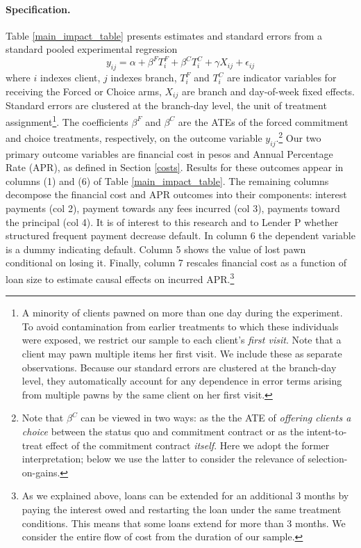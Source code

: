 \documentclass[oneside,11pt]{article}
\begin{document}
\paragraph{Specification.} Table \ref{main_impact_table} presents estimates and standard errors from a standard pooled experimental regression 
\begin{equation} \label{basic_reg}
    y_{ij} = \alpha + \beta^F T_{i}^F + \beta^C T_{i}^C + \gamma X_{ij} + \epsilon_{ij}
\end{equation}
where $i$ indexes client, $j$ indexes branch, $T_{i}^F$ and $T_{i}^C$ are indicator variables for receiving the Forced or Choice arms, $X_{ij}$ are branch and day-of-week fixed effects. Standard errors are clustered at the branch-day level, the unit of treatment assignment\footnote{A minority of clients pawned on more than one day during the experiment. To avoid contamination from earlier treatments to which these individuals were exposed, we restrict our sample to each client's \emph{first visit}. Note that a client may pawn multiple items her first visit. We include these as separate observations. Because our standard errors are clustered at the branch-day level, they automatically account for any dependence in error terms arising from multiple pawns by the same client on her first visit.}.
The coefficients $\beta^F$ and $\beta^C$ are the ATEs of the forced commitment and choice treatments, respectively, on the outcome variable $y_{ij}$.\footnote{Note that $\beta^C$ can be viewed in two ways: as the the ATE of \emph{offering clients a choice} between the status quo and commitment contract or as the intent-to-treat effect of the commitment contract \emph{itself}. Here we adopt the former interpretation; below we use the latter to consider the relevance of selection-on-gains.}
Our two primary outcome variables are financial cost in pesos and Annual Percentage Rate (APR), as defined in Section \ref{costs}. 
Results for these outcomes appear in columns (1) and (6) of Table \ref{main_impact_table}.
The remaining columns decompose the financial cost and APR outcomes into their components: interest payments (col 2), payment towards any fees incurred (col 3), payments toward the principal (col 4). It is of interest to this research and to Lender P whether structured frequent payment decrease default. In column 6 the dependent variable is a dummy indicating default. Column 5 shows the value of lost pawn conditional on losing it. Finally, column 7 rescales financial cost as a function of loan size to estimate causal effects on incurred APR.\footnote{As we explained above, loans can be extended for an additional 3 months by paying the interest owed and restarting the loan under the same treatment conditions. This means that some loans extend for more than 3 months. We consider the entire flow of cost from the duration of our sample.}  
\end{document}

